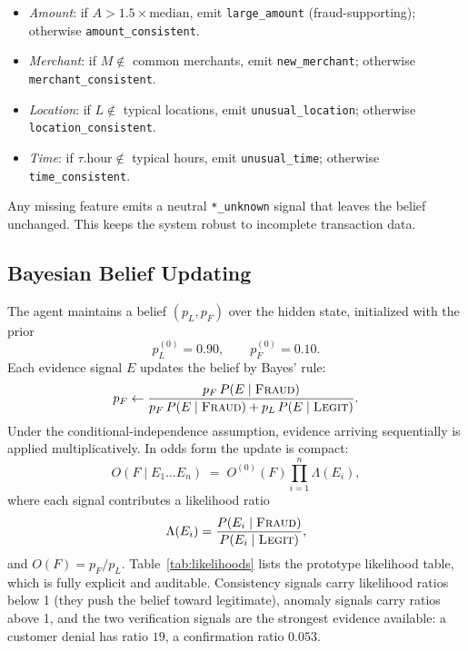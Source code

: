 \documentclass{article}
\begin{document}
\begin{itemize}
  \item \emph{Amount}: if $A > 1.5 \times \text{median}$, emit
  \texttt{large\_amount} (fraud-supporting); otherwise
  \texttt{amount\_consistent}.
  \item \emph{Merchant}: if $M \notin$ common merchants, emit
  \texttt{new\_merchant}; otherwise \texttt{merchant\_consistent}.
  \item \emph{Location}: if $L \notin$ typical locations, emit
  \texttt{unusual\_location}; otherwise \texttt{location\_consistent}.
  \item \emph{Time}: if $\tau.\text{hour} \notin$ typical hours, emit
  \texttt{unusual\_time}; otherwise \texttt{time\_consistent}.
\end{itemize}

Any missing feature emits a neutral \texttt{*\_unknown} signal that leaves the
belief unchanged. This keeps the system robust to incomplete transaction data.

\subsection{Bayesian Belief Updating}

The agent maintains a belief $(p_L, p_F)$ over the hidden state, initialized
with the prior
\begin{equation}
  p_L^{(0)} = 0.90, \qquad p_F^{(0)} = 0.10 .
\end{equation}
Each evidence signal $E$ updates the belief by Bayes' rule:
\begin{equation}
  p_F \leftarrow
  \frac{p_F \, P(E \mid \textsc{Fraud})}
  {p_F \, P(E \mid \textsc{Fraud}) + p_L \, P(E \mid \textsc{Legit})} .
\label{eq:bayes}
\end{equation}
Under the conditional-independence assumption, evidence arriving sequentially
is applied multiplicatively. In odds form the update is compact:
\begin{equation}
  O(F \mid E_1 \dots E_n) \;=\; O^{(0)}(F) \prod_{i=1}^{n} \Lambda(E_i),
\label{eq:odds}
\end{equation}
where each signal contributes a likelihood ratio
\begin{equation}
  \Lambda(E_i) = \frac{P(E_i \mid \textsc{Fraud})}
  {P(E_i \mid \textsc{Legit})},
\label{eq:lambda}
\end{equation}
and $O(F) = p_F / p_L$. Table~\ref{tab:likelihoods} lists the prototype
likelihood table, which is fully explicit and auditable. Consistency signals
carry likelihood ratios below 1 (they push the belief toward legitimate),
anomaly signals carry ratios above 1, and the two verification signals are the
strongest evidence available: a customer denial has ratio $19$, a confirmation
ratio $0.053$.
\end{document}
